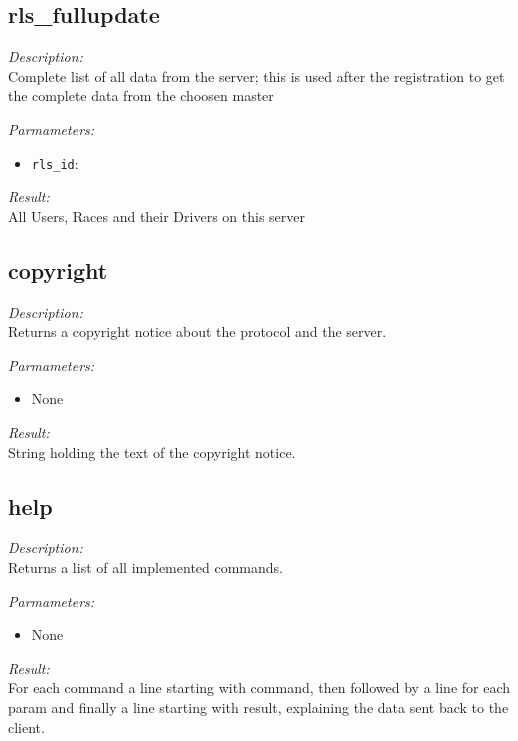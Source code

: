 \subsection{rls\_fullupdate}

\begin{description}
\item {\it Description:}\\
Complete list of all data from the server; this is used after the registration to get the complete data from the choosen master
\item {\it Parmameters:}
\begin{itemize}
\item {\tt rls\_id}: 
\end{itemize}
\item {\it Result:}\\
All Users, Races and their Drivers on this server
\end{description}

\subsection{copyright}

\begin{description}
\item {\it Description:}\\
Returns a copyright notice about the protocol and the server.
\item {\it Parmameters:}
\begin{itemize}
\item None
\end{itemize}
\item {\it Result:}\\
String holding the text of the copyright notice.
\end{description}

\subsection{help}

\begin{description}
\item {\it Description:}\\
Returns a list of all implemented commands.
\item {\it Parmameters:}
\begin{itemize}
\item None
\end{itemize}
\item {\it Result:}\\
For each command a line starting with command, then followed by a line for each param and finally a line starting with result, explaining the data sent back to the client.
\end{description}

